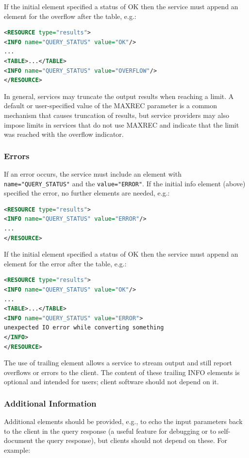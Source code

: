 \documentclass[11pt,letter]{ivoa}
\begin{document}
If the initial  element specified a status of OK then the service must
append an  element for the overflow after the table, e.g.:

\begin{lstlisting}[language=XML]
<RESOURCE type="results">
<INFO name="QUERY_STATUS" value="OK"/>
...
<TABLE>...</TABLE>
<INFO name="QUERY_STATUS" value="OVERFLOW"/>
</RESOURCE>
\end{lstlisting}

In general, services may truncate the output results when reaching a limit. A default or
user-specified value of the MAXREC parameter is a common mechanism that causes truncation
of results, but service providers may also impose limits in services that do not use
MAXREC and indicate that the limit was reached with the overflow indicator.


\subsubsection{Errors}
\label{sect:errors}

If an error occurs, the service must include an  element with
\verb|name="QUERY_STATUS"| and the \verb|value="ERROR"|. If the initial info element (above)
specified the error, no further elements are needed, e.g.:

\begin{lstlisting}[language=XML]
<RESOURCE type="results">
<INFO name="QUERY_STATUS" value="ERROR"/>
...
</RESOURCE>
\end{lstlisting}

If the initial  element specified a status of OK then the service must
append an  element for the error after the table, e.g.:

\begin{lstlisting}[language=XML]
<RESOURCE type="results">
<INFO name="QUERY_STATUS" value="OK"/>
...
<TABLE>...</TABLE>
<INFO name="QUERY_STATUS" value="ERROR">
unexpected IO error while converting something
</INFO>
</RESOURCE>
\end{lstlisting}

The use of trailing  element allows a service to stream output and still
report overflows or errors to the client. The content of these trailing INFO
elements is optional and intended for users; client software should not depend
on it.

\subsubsection{Additional Information}
Additional  elements should be provided, e.g., to echo the input parameters
back to the client in the query response (a useful feature for debugging or to
self-document the query response), but clients should not depend on these. For
example:
\end{document}
